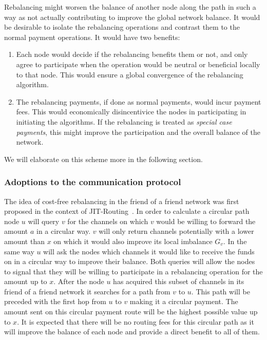 \documentclass[a4paper]{paper}
\begin{document}
Rebalancing might worsen the balance of another node along the path in such a way as not actually contributing to improve the global network balance. 
It would be desirable to isolate the rebalancing operations and contrast them to the normal payment operations. 
It would have two benefits:
\begin{enumerate} 
  \item Each node would decide if the rebalancing benefits them or not, and only agree to participate when the operation would be neutral or beneficial locally to that node. 
  This would ensure a global convergence of the rebalancing algorithm.
  \item The rebalancing payments, if done as normal payments, would incur payment fees. 
  This would economically disincentivice the nodes in participating in initiating the algorithms. 
  If the rebalancing is treated as {\em special case payments}, 
  this might improve the participation and the overall balance of the network. 
\end{enumerate}

We will elaborate on this scheme more in the following section.



\subsubsection{Adoptions to the communication protocol}
\label{sec:lnchanges}

The idea of cost-free rebalancing in the friend of a friend network was first proposed in the context of JIT-Routing~\cite{pickhardt2019jit}.
In order to calculate a circular path node $u$ will query $v$ for the channels on which $v$ would be willing to forward the amount $a$ in a circular way.
$v$ will only return channels potentially with a lower amount than $x$ on which it would also improve its local imbalance $G_{v}$.
In the same way $u$ will ask the nodes which channels it would like to receive the funds on in a circular way to improve their balance.
Both queries will allow the nodes to signal that they will be willing to participate in a rebalancing operation for the amount up to $x$.
After the node $u$ has acquired this subset of channels in its friend of a friend network it searches for a path from $v$ to $u$.
This path will be preceded with the first hop from $u$ to $v$ making it a circular payment.
The amount sent on this circular payment route will be the highest possible value up to $x$.
It is expected that there will be no routing fees for this circular path as it will improve the balance of each node and provide a direct benefit to all of them.
\end{document}
